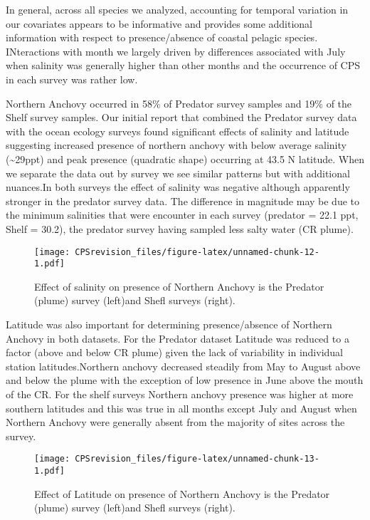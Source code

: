 \documentclass[
]{article}
\begin{document}
In general, across all species we analyzed, accounting for temporal
variation in our covariates appears to be informative and provides some
additional information with respect to presence/absence of coastal
pelagic species. INteractions with month we largely driven by
differences associated with July when salinity was generally higher than
other months and the occurrence of CPS in each survey was rather low.

Northern Anchovy occurred in 58\% of Predator survey samples and 19\% of
the Shelf survey samples. Our initial report that combined the Predator
survey data with the ocean ecology surveys found significant effects of
salinity and latitude suggesting increased presence of northern anchovy
with below average salinity (\textasciitilde29ppt) and peak presence
(quadratic shape) occurring at 43.5 N latitude. When we separate the
data out by survey we see similar patterns but with additional
nuances.In both surveys the effect of salinity was negative although
apparently stronger in the predator survey data. The difference in
magnitude may be due to the minimum salinities that were encounter in
each survey (predator = 22.1 ppt, Shelf = 30.2), the predator survey
having sampled less salty water (CR plume).

\begin{figure}
\centering
\texttt{[image: CPSrevision\_files/figure-latex/unnamed-chunk-12-1.pdf]}
\caption{Effect of salinity on presence of Northern Anchovy is the
Predator (plume) survey (left)and Shefl surveys (right).}
\end{figure}

Latitude was also important for determining presence/absence of Northern
Anchovy in both datasets. For the Predator dataset Latitude was reduced
to a factor (above and below CR plume) given the lack of variability in
individual station latitudes.Northern anchovy decreased steadily from
May to August above and below the plume with the exception of low
presence in June above the mouth of the CR. For the shelf surveys
Northern anchovy presence was higher at more southern latitudes and this
was true in all months except July and August when Northern Anchovy were
generally absent from the majority of sites across the survey.

\begin{figure}
\centering
\texttt{[image: CPSrevision\_files/figure-latex/unnamed-chunk-13-1.pdf]}
\caption{Effect of Latitude on presence of Northern Anchovy is the
Predator (plume) survey (left)and Shefl surveys (right).}
\end{figure}
\end{document}
